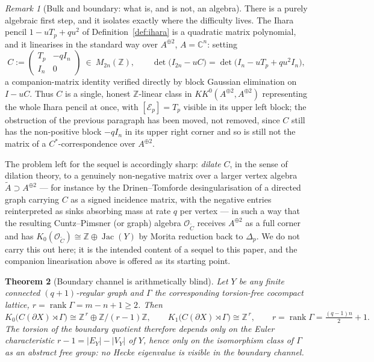 \documentclass[11pt]{amsart}
\numberwithin{equation}{section}
\newtheorem{theorem}{Theorem}[section]
\theoremstyle{definition}
\theoremstyle{remark}
\newtheorem{remark}[theorem]{Remark}
\newcommand{\Z}{\mathbb{Z}}
\newcommand{\C}{\mathbb{C}}
\newcommand{\cE}{\mathcal{E}}
\newcommand{\cO}{\mathcal{O}}
\newcommand{\Jac}{\operatorname{Jac}}
\newcommand{\rank}{\operatorname{rank}}
\begin{document}
\begin{remark}[Bulk and boundary: what is, and is not, an algebra]
There is a purely algebraic first step, and it isolates exactly where the difficulty
lives. The Ihara pencil $1-uT_p+qu^2$ of Definition~\ref{def:ihara} is a quadratic
matrix polynomial, and it linearises in the standard way over $A^{\oplus2}$,
$A=\C^n$: setting
\[
C:=\begin{pmatrix}T_p&-qI_n\\ I_n&0\end{pmatrix}\ \in\ M_{2n}(\Z),
\qquad
\det\bigl(I_{2n}-uC\bigr)=\det\bigl(I_n-uT_p+qu^2I_n\bigr),
\]
a companion-matrix identity verified directly by block Gaussian elimination on
$I-uC$. Thus $C$ is a single, honest $\Z$-linear class in $KK^0(A^{\oplus2},A^{\oplus2})$
representing the whole Ihara pencil at once, with $[\cE_p]=T_p$ visible in its upper
left block; the obstruction of the previous paragraph has been moved, not removed, since
$C$ still has the non-positive block $-qI_n$ in its upper right corner and so is still
not the matrix of a $C^*$-correspondence over $A^{\oplus2}$.

The problem left for the sequel is accordingly sharp: \emph{dilate} $C$, in the sense of
dilation theory, to a genuinely non-negative matrix over a larger vertex algebra
$\widetilde A\supset A^{\oplus2}$ --- for instance by the Drinen--Tomforde
desingularisation of a directed graph carrying $C$ as a signed incidence matrix, with the
negative entries reinterpreted as sinks absorbing mass at rate $q$ per vertex --- in such
a way that the resulting Cuntz--Pimsner (or graph) algebra $\cO_{\widetilde C}$ receives
$A^{\oplus2}$ as a full corner and has $K_0(\cO_{\widetilde C})\cong\Z\oplus\Jac(Y)$ by
Morita reduction back to $\Delta_p$. We do not carry this out here; it is the intended
content of a sequel to this paper, and the companion linearisation above is offered as
its starting point.
\end{remark}

\begin{theorem}[Boundary channel is arithmetically blind]\label{thm:blind}
Let $Y$ be any finite connected $(q+1)$-regular graph and $\Gamma$ the corresponding
torsion-free cocompact lattice, $r=\rank\Gamma=m-n+1\ge2$. Then
\[
K_0\bigl(C(\partial X)\rtimes\Gamma\bigr)\cong\Z^{\,r}\oplus\Z/(r-1)\Z,
\qquad
K_1\bigl(C(\partial X)\rtimes\Gamma\bigr)\cong\Z^{\,r},
\qquad r=\rank\Gamma=\tfrac{(q-1)n}{2}+1 .
\]
The torsion of the boundary quotient therefore depends only on the Euler characteristic
$r-1=|E_Y|-|V_Y|$ of $Y$, hence only on the isomorphism class of $\Gamma$ as an abstract
free group: \emph{no Hecke eigenvalue is visible in the boundary channel.}
\end{theorem}
\end{document}
